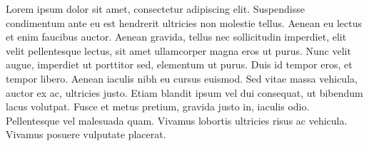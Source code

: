 Lorem ipsum dolor sit amet, consectetur adipiscing elit. Suspendisse condimentum ante eu est hendrerit ultricies non molestie tellus. Aenean eu lectus et enim faucibus auctor. Aenean gravida, tellus nec sollicitudin imperdiet, elit velit pellentesque lectus, sit amet ullamcorper magna eros ut purus. Nunc velit augue, imperdiet ut porttitor sed, elementum ut purus. Duis id tempor eros, et tempor libero. Aenean iaculis nibh eu cursus euismod. Sed vitae massa vehicula, auctor ex ac, ultricies justo. Etiam blandit ipsum vel dui consequat, ut bibendum lacus volutpat. Fusce et metus pretium, gravida justo in, iaculis odio. Pellentesque vel malesuada quam. Vivamus lobortis ultricies risus ac vehicula. Vivamus posuere vulputate placerat.
